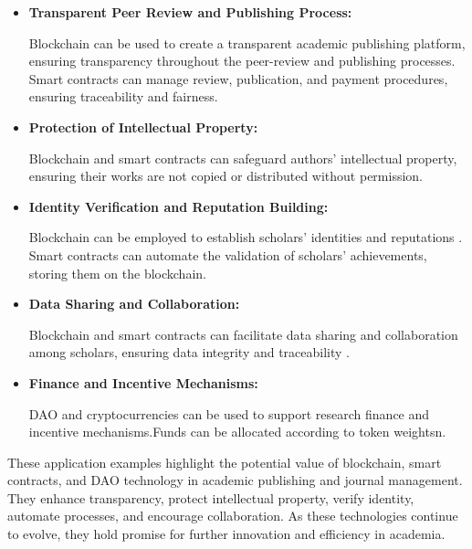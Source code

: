 \documentclass[lettersize,journal]{IEEEtran}
\begin{document}
\begin{itemize}
  \item \textbf{Transparent Peer Review and Publishing Process:} 
  
  Blockchain can be used to create a transparent academic publishing platform, ensuring transparency throughout the peer-review and publishing processes.\cite{nakamoto2008bitcoin} Smart contracts can manage review, publication, and payment procedures, ensuring traceability and fairness.

  \item \textbf{Protection of Intellectual Property:}
  
  Blockchain and smart contracts can safeguard authors' intellectual property, ensuring their works are not copied or distributed without permission.
  
  \item \textbf{Identity Verification and Reputation Building:} 
  
  Blockchain can be employed to establish scholars' identities and reputations \cite{radziwill2018blockchain}. Smart contracts can automate the validation of scholars' achievements, storing them on the blockchain.
  
  \item \textbf{Data Sharing and Collaboration:} 
  
  Blockchain and smart contracts can facilitate data sharing and collaboration among scholars, ensuring data integrity and traceability \cite{praitheeshan2019security}.
  
  \item \textbf{Finance and Incentive Mechanisms:} 
  
  DAO and cryptocurrencies can be used to support research finance and incentive mechanisms.Funds can be allocated according to token weightsn.
\end{itemize}

These application examples highlight the potential value of blockchain, smart contracts, and DAO technology in academic publishing and journal management. They enhance transparency, protect intellectual property, verify identity, automate processes, and encourage collaboration. As these technologies continue to evolve, they hold promise for further innovation and efficiency in academia.
\end{document}
